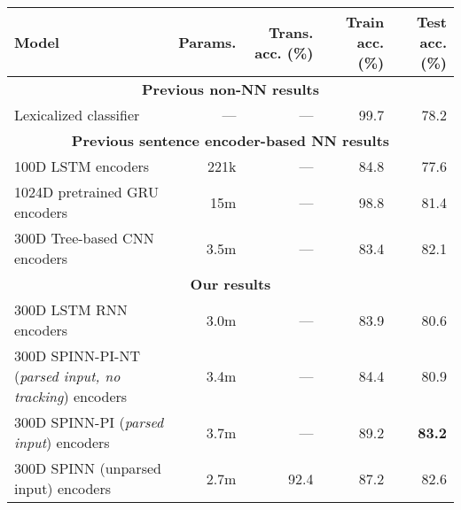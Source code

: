 \documentclass[11pt]{article}
\newcommand\result[1]{\textcolor{red}{\textbf{RESULT NEEDED:} #1}}
\def\ii#1{\textit{#1}}
\begin{document}
\begin{table*}[t]
  \centering\small
  \begin{tabular}{lrrrr} 
    \toprule
Model                   & Params.    & Trans. acc. (\%)  &   Train acc. (\%)  &   Test acc. (\%) \\
\midrule
\multicolumn{5}{c}{\textbf{Previous non-NN results}}\\
Lexicalized classifier \citep{snli:emnlp2015}
                        & ---                & ---                    &   99.7   &   78.2      \\
\midrule
\multicolumn{5}{c}{\textbf{Previous sentence encoder-based NN results}}\\
100D LSTM encoders \citep{snli:emnlp2015}
                        & 221k               & ---               &   84.8   &   77.6      \\
1024D pretrained GRU encoders \citep{DBLP:journals/corr/VendrovKFU15}
                        & 15m                & ---              &   98.8   &   81.4       \\
300D Tree-based CNN encoders \citep{mou2015recognizing}
                        & 3.5m                & ---             &   83.4   &   82.1       \\
\midrule
\multicolumn{5}{c}{\textbf{Our results}}\\
300D LSTM RNN encoders         & 3.0m                  & ---                &   83.9      &   80.6       \\
300D SPINN-PI-NT (\ii{parsed input, no tracking}) encoders
                        & 3.4m                  & ---                &   84.4      &   80.9       \\
300D SPINN-PI (\ii{parsed input}) encoders
                        & 3.7m                  & ---                &   89.2      &   \textbf{83.2}       \\
300D SPINN (unparsed input) encoders
                        & 2.7m                  & 92.4           &   87.2    &   82.6      \\          

\end{tabular}
\end{table*}
\end{document}
